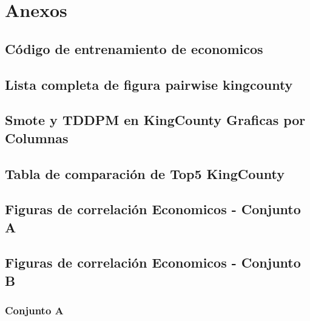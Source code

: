 \chapter{Anexos}

\section{Código de entrenamiento de economicos}



\section{Lista completa de figura pairwise kingcounty}
\label{A-pairwise-kingcounty-top2-a-1}



\section{Smote y TDDPM en KingCounty Graficas por Columnas}

%

\section{Tabla de comparación de Top5 KingCounty}

\section{Figuras de correlación Economicos - Conjunto A}
\label{pairwise-full-a}



\section{Figuras de correlación Economicos - Conjunto B}
\label{pairwise-full-a}


\subsection{Conjunto A}
%

